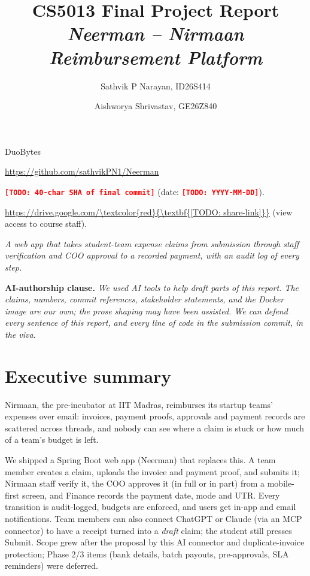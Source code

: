 \documentclass[11pt,a4paper]{article}
\title{
    CS5013 Final Project Report\\
    \large\textit{Neerman -- Nirmaan Reimbursement Platform}
}
\author{Sathvik P Narayan, ID26S414 \and Aishworya Shrivastav, GE26Z840}
\date{}
\newcommand{\todo}[1]{\textcolor{red}{\textbf{[TODO: #1]}}}
\begin{document}
\maketitle
\vspace{-2.0em}

\begin{description}[
    leftmargin=!,
    labelwidth=\widthof{\textbf{Submission commit:}},
    nosep,
    font=\bfseries
]
    \item[Team Name:] DuoBytes
    \item[Repository:] \url{https://github.com/sathvikPN1/Neerman}
    \item[Submission commit:] \texttt{\todo{40-char SHA of final commit}} (date: \texttt{\todo{YYYY-MM-DD}}).
    \item[Docker image:] \url{https://drive.google.com/\todo{share-link}} (view access to course staff).
    \item[Tagline:] \textit{A web app that takes student-team expense claims from submission through staff verification and COO approval to a recorded payment, with an audit log of every step.}
\end{description}

\textbf{AI-authorship clause.}
\textit{
We used AI tools to help draft parts of this report. The claims,
numbers, commit references, stakeholder statements, and the Docker
image are our own; the prose shaping may have been assisted. We can
defend every sentence of this report, and every line of code in the
submission commit, in the viva.
}

\section{Executive summary}

Nirmaan, the pre-incubator at IIT Madras, reimburses its startup teams' expenses over email: invoices, payment proofs, approvals and payment records are scattered across threads, and nobody can see where a claim is stuck or how much of a team's budget is left.

We shipped a Spring Boot web app (Neerman) that replaces this. A team member creates a claim, uploads the invoice and payment proof, and submits it; Nirmaan staff verify it, the COO approves it (in full or in part) from a mobile-first screen, and Finance records the payment date, mode and UTR. Every transition is audit-logged, budgets are enforced, and users get in-app and email notifications. Team members can also connect ChatGPT or Claude (via an MCP connector) to have a receipt turned into a \emph{draft} claim; the student still presses Submit. Scope grew after the proposal by this AI connector and duplicate-invoice protection; Phase 2/3 items (bank details, batch payouts, pre-approvals, SLA reminders) were deferred.
\end{document}
